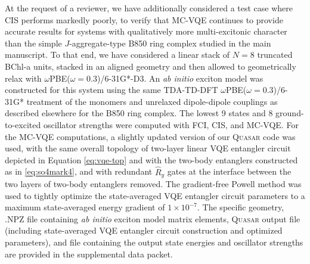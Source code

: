 At the request of a reviewer, we have additionally considered a test case where
CIS performs markedly poorly, to verify that MC-VQE continues to provide
accurate results for systems with qualitatively more multi-excitonic character
than the simple $J$-aggregate-type B850 ring complex studied in the main
manuscript. To that end, we have considered a linear stack of $N=8$ truncated
BChl-a units, stacked in an aligned geometry and then allowed to geometrically
relax with $\omega$PBE($\omega=0.3$)/6-31G*-D3. An \emph{ab initio} exciton
model was constructed for this system using the same TDA-TD-DFT
$\omega$PBE($\omega=0.3$)/6-31G* treatment of the monomers and unrelaxed
dipole-dipole couplings as described elsewhere for the B850 ring complex. The
lowest 9 states and 8 ground-to-excited oscillator strengths were computed with
FCI, CIS, and MC-VQE. For the MC-VQE computations, a slightly updated version of
our \textsc{Quasar} code was used, with the same overall topology of two-layer
linear VQE entangler circuit depicted in Equation \ref{eq:vqe-top} and with the
two-body entanglers constructed as in \ref{eq:so4mark4}, and with redundant
$\hat R_y$ gates at the interface between the two layers of two-body entanglers
removed. The gradient-free Powell method was used to tightly optimize the
state-averaged VQE entangler circuit parameters to a maximum state-averaged
energy gradient of $1\times10^{-7}$. The specific geometry, \textsc{.NPZ} file
containing \emph{ab initio} exciton model matrix elements, \textsc{Quasar}
output file (including state-averaged VQE entangler circuit construction and
optimized parameters), and  file containing the output state energies
and oscillator strengths are provided in the supplemental data packet.

